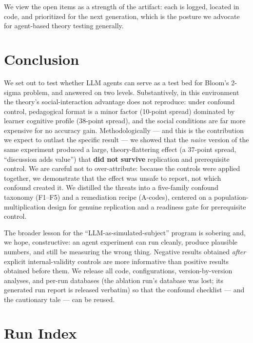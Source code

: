 \documentclass[11pt]{article}
\begin{document}
We view the open items as a strength of the artifact: each is logged, located in
code, and prioritized for the next generation, which is the posture we advocate for
agent-based theory testing generally.

\section{Conclusion}

We set out to test whether LLM agents can serve as a test bed for Bloom's 2-sigma
problem, and answered on two levels.  Substantively, in this environment the theory's
social-interaction advantage does not reproduce: under confound control, pedagogical
format is a minor factor (10-point spread) dominated by learner cognitive profile
(38-point spread), and the social conditions are far more expensive for no accuracy
gain.  Methodologically --- and this is the contribution we expect to outlast the
specific result --- we showed that the \emph{naive} version of the same experiment
produced a large, theory-flattering effect (a 37-point spread, ``discussion adds
value'') that \textbf{did not survive} replication and prerequisite control.  We are
careful not to over-attribute: because the controls were applied together, we
demonstrate that the effect was unsafe to report, not which confound created it.  We
distilled the threats into a five-family confound taxonomy (F1--F5) and a remediation
recipe (A-codes), centered on a population-multiplication design for genuine
replication and a readiness gate for prerequisite control.

The broader lesson for the ``LLM-as-simulated-subject'' program is sobering and, we
hope, constructive: an agent experiment can run cleanly, produce plausible numbers,
and still be measuring the wrong thing.  Negative results obtained \emph{after}
explicit internal-validity controls are more informative than positive results
obtained before them.  We release all code, configurations, version-by-version
analyses, and per-run databases (the ablation run's database was lost; its
generated run report is released verbatim) so that the confound checklist ---
and the cautionary tale --- can be reused.

\appendix

\section{Run Index}
\label{appendix:runs}
\end{document}
